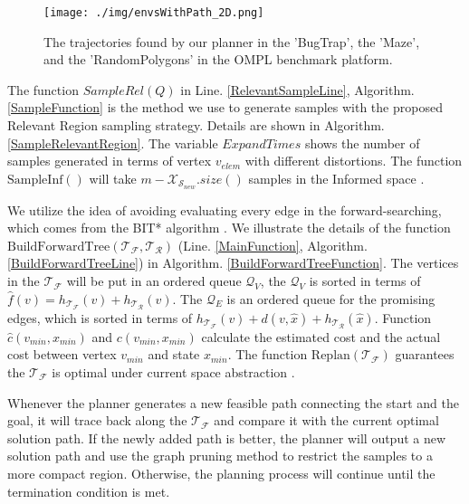 \begin{figure}[t]
    \centering
    \texttt{[image: ./img/envsWithPath\_2D.png]}   
    \caption{The trajectories found by our planner in the 'BugTrap', the 'Maze', and the 'RandomPolygons' in the OMPL benchmark platform.}
    \label{SimulationPath_2D}
\end{figure}




The function $SampleRel(Q)$ in Line. \ref{RelevantSampleLine}, Algorithm. \ref{SampleFunction} is the method we use to generate samples with the proposed Relevant Region sampling strategy.
Details are shown in Algorithm. \ref{SampleRelevantRegion}. 
The variable $ExpandTimes$ shows the number of samples generated in terms of vertex $v_{elem}$ with different distortions.
The function $\text{SampleInf}()$ will take $m - \mathcal{X}_{\mathcal{S}_{new}}.size()$ samples in the Informed space \cite{gammell2018informed}.




We utilize the idea of avoiding evaluating every edge in the forward-searching, which comes from the BIT* algorithm \cite{gammell2020batch}.
We illustrate the details of the function $\text{BuildForwardTree}(\mathcal{T}_{\mathcal{F}}, \mathcal{T}_{\mathcal{R}})$ (Line. \ref{MainFunction}, Algorithm. \ref{BuildForwardTreeLine}) in Algorithm. \ref{BuildForwardTreeFunction}.
The vertices in the $\mathcal{T}_{\mathcal{F}}$ will be put in an ordered queue $\mathcal{Q}_{V}$, the $\mathcal{Q}_{V}$ is sorted in terms of $\hat{f}(v) = h_{\mathcal{T}_{\mathcal{F}}}(v) + h_{\mathcal{T}_{\mathcal{R}}}(v)$. 
The $\mathcal{Q}_{E}$ is an ordered queue for the promising edges, which is sorted in terms of $h_{\mathcal{T}_{\mathcal{F}}}(v) + d(v, \hat{x}) + h_{\mathcal{T}_{\mathcal{R}}}(\hat{x})$.
Function $\hat{c}(v_{min}, x_{min})$ and $c(v_{min}, x_{min})$ calculate the estimated cost and the actual cost between vertex $v_{min}$ and state $x_{min}$.
The function $\text{Replan}(\mathcal{T}_{\mathcal{F}})$ guarantees the $\mathcal{T}_{\mathcal{F}}$ is optimal under current space abstraction \cite{arslan2013use}.


Whenever the planner generates a new feasible path connecting the start and the goal, it will trace back along the $\mathcal{T}_{\mathcal{F}}$ and compare it with the current optimal solution path. 
If the newly added path is better, the planner will output a new solution path and use the graph pruning method to restrict the samples to a more compact region.
Otherwise, the planning process will continue until the termination condition is met.